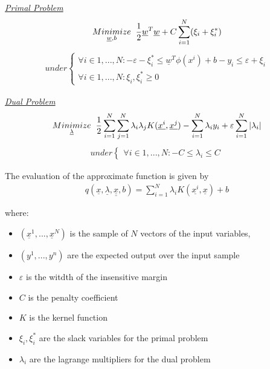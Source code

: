 {  \underline{\textit{Primal Problem}}\\
  \begin{align*}
    \underset{\underline{w}, b}{Minimize} \hspace{2mm} \frac{1}{2} \underline{w}^T\underline{w} + C \sum_{i=1}^N (\xi_i + \xi_i^*)
  \end{align*}
  \begin{align*}
    under \begin{cases} \forall i \in {1,...,N}: -\varepsilon -\xi_i^* \le \underline{w}^T \phi(x^i) + b - y_i \le \varepsilon + \xi_i \\ \forall i \in {1,...,N} : \xi_i, \xi_i^* \ge 0 \end{cases}
  \end{align*}

  \underline{\textit{Dual Problem}}\\

  \begin{align*}
    \underset{\underline{\lambda}}{Minimize} \hspace{2mm} \frac{1}{2} \sum_{i=1}^{N} \sum_{j=1}^{N} \lambda_i \lambda_j K(\underline{x^i}, \underline{x^j}) - \sum_{i=1}^{N} \lambda_i y_i + \varepsilon \sum_{i=1}^{N} \vert \lambda_i \vert
  \end{align*}
  \begin{align*}
    under \begin{cases} \forall i \in {1,...,N}:  -C \le \lambda_i \le C \end{cases}
  \end{align*}

  The evaluation of the approximate function is given by
  \begin{align*}
    q\left( \underline{x}, \underline{\lambda}, \underline{\underline{x}}, b \right) =  \sum_{i=1}^N \lambda_i K(\underline{x^i}, \underline{x}) + b
  \end{align*}

  where:
  \begin{itemize}
  \item $(\underline{x}^1,...,\underline{x}^N)$ is the sample of $N$ vectors of the input variables,
  \item $ (y^1,...,y^n)$ are the expected output over the input sample
  \item $\varepsilon$ is the witdth of the insensitive margin
  \item $C$ is the penalty coefficient
  \item $K$ is the kernel function
  \item $\xi_i, \xi_i^*$ are the slack variables for the primal problem
  \item $\lambda_i$ are the lagrange multipliers for the dual problem
  \end{itemize}

}
